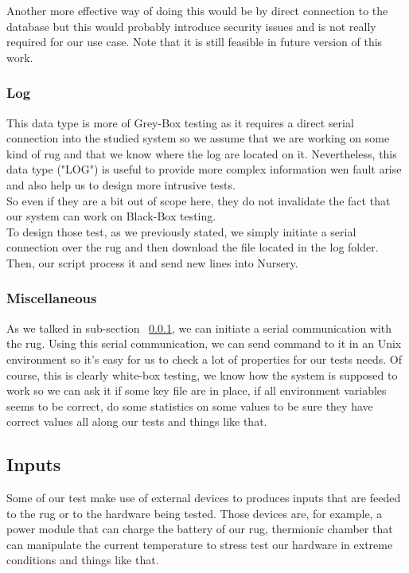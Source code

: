 \documentclass[12pt]{article}
\theoremstyle{definition}
\theoremstyle{definition}
\theoremstyle{remark}
\begin{document}
Another more effective way of doing this would be by direct connection to the database but this would probably introduce security issues and is not really required for our use case. Note that it is still feasible in future version of this work.

\subsubsection{Log}
\label{subsec:log}

This data type is more of Grey-Box testing as it requires a direct serial connection into the studied system so we assume that we  are working on some kind of \gls{rug} and that we know where the log are located on it. Nevertheless, this data type ("LOG") is useful to provide more complex information wen fault arise and also help us to design more intrusive tests.\\

So even if they are a bit out of scope here, they do not invalidate the fact that our system can work on Black-Box testing.\\

To design those test, as we previously stated, we simply initiate a serial connection over the \gls{rug} and then download the file located in the log folder. Then, our script process it and send new lines into Nursery.

\subsubsection{Miscellaneous}
\label{subsec:misc}

As we talked in sub-section ~\ref{subsec:log}, we can initiate a serial communication with the \gls{rug}. Using this serial communication, we can send command to it in an Unix environment so it's easy for us to check a lot of properties for our tests needs. Of course, this is clearly white-box testing, we know how the system is supposed to work so we can ask it if some key file are in place, if all environment variables seems to be correct, do some statistics on some values to be sure they have correct values all along our tests and things like that.\\

\subsection{Inputs}

Some of our test make use of external devices to produces inputs that are feeded to the \gls{rug} or to the hardware being tested. Those devices are, for example, a power module that can charge the battery of our \gls{rug}, thermionic chamber that can manipulate the current temperature to stress test our hardware in extreme conditions and things like that.\\
\end{document}
